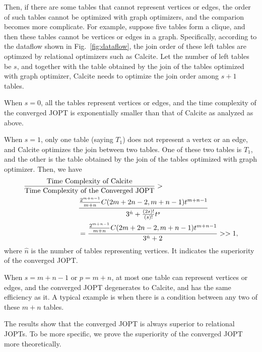 Then, if there are some tables that cannot represent vertices or edges, the order of such tables cannot be optimized with graph optimizers, and the comparion becomes more complicate.
For example, suppose five tables form a clique, and then these tables cannot be vertices or edges in a graph.
Specifically, according to the dataflow shown in Fig.~\ref{fig:dataflow}, the join order of these left tables are optimzed by relational optimizers such as Calcite.
Let the number of left tables be $s$, and together with the table obtained by the join of the tables optimized with graph optimizer, Calcite needs to optimize the join order among $s + 1$ tables.

When $s = 0$, all the tables represent vertices or edges, and the time complexity of the converged JOPT is exponentially smaller than that of Calcite as analyzed as above.

When $s = 1$, only one table (saying $T_1$) does not represent a vertex or an edge, and Calcite optimizes the join between two tables.
One of these two tables is $T_1$, and the other is the table obtained by the join of the tables optimized with graph optimizer.
Then, we have
\begin{equation*}
    \begin{split}
        \frac{\text{Time Complexity of Calcite}}{\text{Time Complexity of the Converged JOPT}} > \hspace{-12em} & \\
        & \frac{\frac{2^{m+n-1}}{m+n}C(2m+2n-2, m+n-1)t^{m + n - 1}}{3^{\hat{n}} + \frac{(2s)!}{(s)!}t^{s}} \\
        & = \frac{\frac{2^{m+n-1}}{m+n}C(2m+2n-2, m+n-1)t^{m + n - 1}}{3^{\hat{n}} + 2} >> 1,
    \end{split}
\end{equation*}
where $\hat{n}$ is the number of tables representing vertices.
It indicates the superiority of the converged JOPT.

When $s = m + n - 1$ or $p = m + n$, at most one table can represent vertices or edges, and the converged JOPT degenerates to Calcite, and has the same efficiency as it.
A typical example is when there is a condition between any two of these $m + n$ tables.

The results show that the converged JOPT is always superior to relational JOPTs.
To be more specific, we prove the superiority of the converged JOPT more theoretically.

